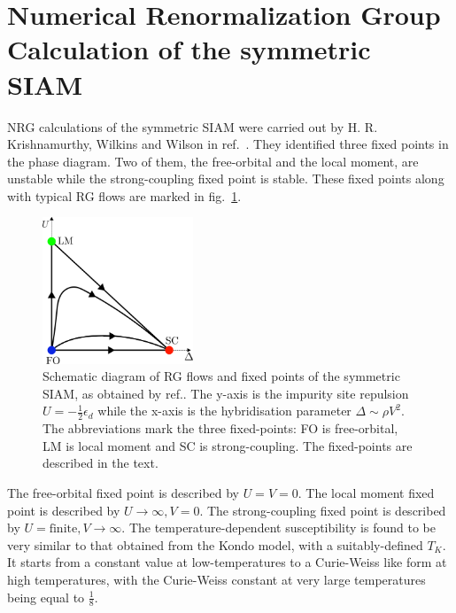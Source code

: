 \section{Numerical Renormalization Group Calculation of the symmetric SIAM}
NRG calculations of the symmetric SIAM were carried out by H. R. Krishnamurthy, Wilkins and Wilson in ref.~\cite{hrk_wilson_1980}. They identified three fixed points in the phase diagram. Two of them, the free-orbital and the local moment, are unstable while the strong-coupling fixed point is stable. These fixed points along with typical RG flows are marked in fig.~\ref{nrg_fp}.
\begin{figure}[htpb]
	\centering
	\includegraphics[width=0.4\textwidth]{../figures/nrg_fpoints.png}
	\caption{Schematic diagram of RG flows and fixed points of the symmetric SIAM, as obtained by ref.\cite{hrk_wilson_1980}. The y-axis is the impurity site repulsion \(U = -\frac{1}{2}\epsilon_d\) while the x-axis is the hybridisation parameter \(\Delta \sim \rho V^2\). The abbreviations mark the three fixed-points: FO is free-orbital, LM is local moment and SC is strong-coupling. The fixed-points are described in the text.}
	\label{nrg_fp}
\end{figure}
The free-orbital fixed point is described by \(U=V=0\). The local moment fixed point is described by \(U \to \infty, V=0\). The strong-coupling fixed point is described by \(U=\text{finite}, V \to \infty\). The temperature-dependent susceptibility is found to be very similar to that obtained from the Kondo model, with a suitably-defined \(T_K\). It starts from a constant value at low-temperatures to a Curie-Weiss like form at high temperatures, with the Curie-Weiss constant at very large temperatures being equal to \(\frac{1}{8}\).
